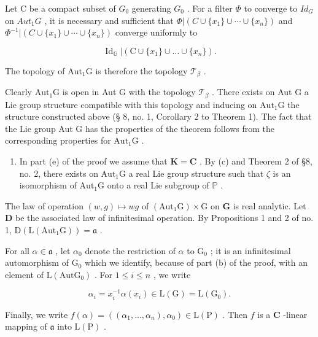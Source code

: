 Let C be a compact subset of \(G_{0}\) generating \(G_{0}\) . For a filter \(\Phi\) to converge to \(Id_{G}\) on \(Aut_{1}G\) , it is necessary and sufficient that \(\Phi|(C \cup \{x_{1}\} \cup \cdots \cup \{x_{n}\})\) and \(\Phi^{-1}|(C \cup \{x_{1}\} \cup \cdots \cup \{x_{n}\})\) converge uniformly to

\[
\operatorname{Id} _ {\mathbb {G}} \left| \left(\mathrm{C} \cup \{x _ {1} \} \cup \dots \cup \{x _ {n} \}\right). \right.
\]

The topology of \(\mathrm{Aut}_1\mathrm{G}\) is therefore the topology \(\mathcal{T}_{\beta}\) .

Clearly \(\mathrm{Aut}_1\mathrm{G}\) is open in Aut G with the topology \(\mathcal{T}_{\beta}\) . There exists on Aut G a Lie group structure compatible with this topology and inducing on \(\mathrm{Aut}_1\mathrm{G}\) the structure constructed above (§ 8, no. 1, Corollary 2 to Theorem 1). The fact that the Lie group Aut G has the properties of the theorem follows from the corresponding properties for \(\mathrm{Aut}_1\mathrm{G}\) .

\begin{enumerate}
\def\labelenumi{(\alph{enumi})}
\setcounter{enumi}{4}
\tightlist
\item
  In part (e) of the proof we assume that \(\mathbf{K} = \mathbf{C}\) . By (c) and Theorem 2 of §8, no. 2, there exists on \(\mathrm{Aut}_1\mathrm{G}\) a real Lie group structure such that \(\zeta\) is an isomorphism of \(\mathrm{Aut}_1\mathrm{G}\) onto a real Lie subgroup of \(\mathbb{P}\) .
\end{enumerate}

The law of operation \((w, g) \mapsto wg\) of \((\mathrm{Aut}_1\mathrm{G}) \times \mathrm{G}\) on \(\mathbf{G}\) is real analytic. Let \(\mathbf{D}\) be the associated law of infinitesimal operation. By Propositions 1 and 2 of no. 1, \(\mathrm{D}(\mathrm{L}(\mathrm{Aut}_1\mathrm{G})) = \mathfrak{a}\) .

For all \(\alpha \in \mathfrak{a}\) , let \(\alpha_0\) denote the restriction of \(\alpha\) to \(\mathrm{G}_0\) ; it is an infinitesimal automorphism of \(\mathrm{G}_0\) which we identify, because of part (b) of the proof, with an element of \(\mathrm{L}(\mathrm{Aut}\mathrm{G}_0)\) . For \(1 \leqslant i \leqslant n\) , we write

\[
\alpha_ {i} = x _ {i} ^ {- 1} \alpha (x _ {i}) \in \mathrm{L} (\mathrm{G}) = \mathrm{L} (\mathrm{G} _ {0}).
\]

Finally, we write \(f(\alpha) = ((\alpha_1, \ldots, \alpha_n), \alpha_0) \in \mathrm{L}(\mathrm{P})\) . Then \(f\) is a \(\mathbf{C}\) -linear mapping of \(\mathfrak{a}\) into \(\mathrm{L}(\mathrm{P})\) .

